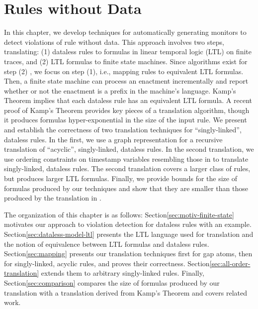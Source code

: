 \chapter{Rules without Data}
\label{chapter:ltl-translation}

In this chapter,
we develop techniques for automatically generating monitors
to detect violations of rule without data.
This approach involves two steps, translating:
(1) dataless rules to formulas in linear temporal logic (LTL) on finite traces,
and
(2) LTL formulas to finite state machines.
Since algorithms exist for step (2) \cite{vardi1986automata,laroussinie2002temporal,gastin2003ltl},
we focus on step (1),
i.e., mapping rules to equivalent LTL formulas.
Then,
a finite state machine can process an enactment incrementally
and report whether or not the enactment is a prefix in the machine's language.
Kamp's Theorem \cite{kamp1968tense} implies that each dataless rule has an equivalent LTL formula.
A recent proof of Kamp's Theorem \cite{rabinovich2014proof}
provides key pieces of a translation algorithm,
though it produces formulas hyper-exponential in the size of the input rule.
We present and establish the correctness of two translation techniques 
for ``singly-linked'', dataless rules.
In the first, we use a graph representation
for a recursive translation of ``acyclic'', singly-linked, dataless rules.
In the second translation,
we use ordering constraints on timestamp variables
resembling those in \cite{rabinovich2014proof}
to translate singly-linked, dataless rules.
The second translation covers a larger class of rules,
but produces larger LTL formulas.
Finally,
we provide bounds for the size of formulas produced by our techniques
and show that they are smaller than those produced by the translation in \cite{rabinovich2014proof}.

The organization of this chapter is as follows:
Section\:\ref{sec:motiv-finite-state}
motivates our approach to violation detection for dataless rules with an example.
Section\:\ref{sec:dataless-model-ltl}
presents the LTL language used for translation
and the notion of equivalence between LTL formulas and dataless rules.
Section\:\ref{sec:mapping} presents
our translation techniques first for gap atoms,
then for singly-linked, acyclic rules,
and proves their correctness.
Section\:\ref{sec:all-order-translation}
extends them to arbitrary singly-linked rules.
Finally,
Section\:\ref{sec:comparison}
compares the size of formulas produced by our translation
with a translation derived from Kamp's Theorem
and covers related work.

